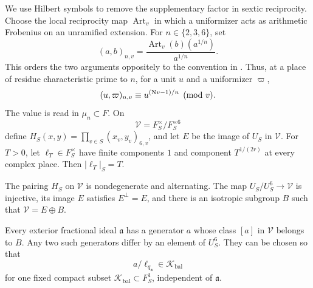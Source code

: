We use Hilbert symbols to remove the supplementary factor in sextic
reciprocity.  Choose the local reciprocity map \(\operatorname{Art}_v\) in
which a uniformizer acts as arithmetic Frobenius on an unramified extension.
For \(n\in\{2,3,6\}\), set
\[
 (a,b)_{n,v}
   =\frac{\operatorname{Art}_v(b)(a^{1/n})}{a^{1/n}}.
\]
This orders the two arguments oppositely to the convention in
\cite[Chapter~V, \S3]{Neukirch99}.  Thus, at a place of residue
characteristic prime to \(n\), for a unit \(u\) and a uniformizer \(\varpi\),
\[
 (u,\varpi)_{n,v}\equiv u^{(\mathrm{N} v-1)/n}\pmod v.
\]
The value is read in \(\mu_n\subset F\).  On
\[
 \mathcal V=F_S^\times/F_S^{\times6}
\]
define \(H_S(x,y)=\prod_{v\in S}(x_v,y_v)_{6,v}\), and let \(E\) be the image
of \(U_S\) in \(\mathcal V\).  For \(T>0\), let \(\ell_T\in F_S^\times\)
have finite components \(1\) and component \(T^{1/(2r)}\) at every complex
place.  Then \(|\ell_T|_S=T\).

\begin{lemma}\label{lem:balanced-generators}
The pairing \(H_S\) on \(\mathcal V\) is nondegenerate and alternating.
The map \(U_S/U_S^6\to\mathcal V\) is injective, its image \(E\) satisfies
\(E^\perp=E\), and there is an isotropic subgroup \(B\) such that
\(\mathcal V=E\oplus B\).

Every exterior fractional ideal \(\mathfrak a\) has a generator \(a\) whose
class \([a]\) in \(\mathcal V\) belongs to \(B\).  Any two such generators
differ by an element of \(U_S^6\).  They can be chosen so that
\[
 a/\ell_{q_{\mathfrak a}}\in\mathcal K_{\mathrm{bal}}
\]
for one fixed compact subset \(\mathcal K_{\mathrm{bal}}\subset F_S^1\), independent of
\(\mathfrak a\).
\end{lemma}

